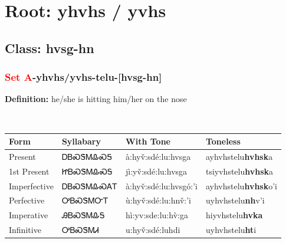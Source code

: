 \needspace{4in}
\section*{Root: yhvhs / yvhs}
\nopagebreak
{}
\needspace{3in}
\subsection*{Class: hvsg-hn}
\nopagebreak
\needspace{2in}
\subsubsection*{\textcolor{Red}{Set A}{-}\textbf{yhvhs/yvhs}{-}telu{-}[hvsg-hn]}
\nopagebreak
\textbf{Definition: } he/she is hitting him/her on the nose
\\[0.5em]
\begin{tabularx}{\textwidth}{l X X X}%
\toprule%
\textbf{Form}&\textbf{Syllabary}&\textbf{With Tone}&\textbf{Toneless}\\%
\midrule%
Present&ᎠᏴᏍᏕᎷᎲᏍᎦ&à:hyv̌:sdé:lu:hvsga&ayhvhstelu\textbf{hvhsk}a\\%
1st Present&ᏥᏴᏍᏕᎷᎲᏍᎦ&jì:yv̌:sdé:lu:hvsga&tsiyvhstelu\textbf{hvhsk}a\\%
Imperfective&ᎠᏴᏍᏕᎷᎲᏍᎪᎢ&à:hyv̌:sdé:lu:hvsgó:’i&ayhvhstelu\textbf{hvhsk}o'i\\%
Perfective&ᎤᏴᏍᏕᎷᏅᎢ&ù:hyv̌:sdé:lu:hnv̌:’i&uyhvhstelu\textbf{nh}v'i\\%
Imperative&ᎯᏴᏍᏕᎷᎲᎦ&hì:yv:sde:lu:hv̀:ga&hiyvhstelu\textbf{hvka}\\%
Infinitive&ᎤᏴᏍᏕᎷᏗ&u:hyv̌:sdé:luhdi&uyhvhstelu\textbf{ht}i\\%
\bottomrule%
\end{tabularx}
\\[1em]